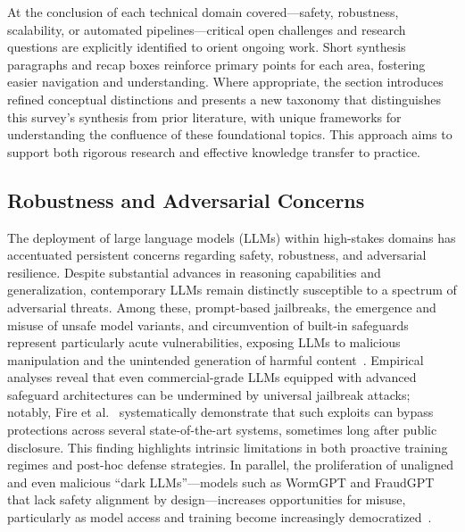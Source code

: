 \documentclass[sigconf]{acmart}
\begin{document}
At the conclusion of each technical domain covered—safety, robustness, scalability, or automated pipelines—critical open challenges and research questions are explicitly identified to orient ongoing work. Short synthesis paragraphs and recap boxes reinforce primary points for each area, fostering easier navigation and understanding. Where appropriate, the section introduces refined conceptual distinctions and presents a new taxonomy that distinguishes this survey's synthesis from prior literature, with unique frameworks for understanding the confluence of these foundational topics. This approach aims to support both rigorous research and effective knowledge transfer to practice.

\subsection{Robustness and Adversarial Concerns}

The deployment of large language models (LLMs) within high-stakes domains has accentuated persistent concerns regarding safety, robustness, and adversarial resilience. Despite substantial advances in reasoning capabilities and generalization, contemporary LLMs remain distinctly susceptible to a spectrum of adversarial threats. Among these, prompt-based jailbreaks, the emergence and misuse of unsafe model variants, and circumvention of built-in safeguards represent particularly acute vulnerabilities, exposing LLMs to malicious manipulation and the unintended generation of harmful content~\cite{ref78,ref82}. Empirical analyses reveal that even commercial-grade LLMs equipped with advanced safeguard architectures can be undermined by universal jailbreak attacks; notably, Fire et al.~\cite{ref82} systematically demonstrate that such exploits can bypass protections across several state-of-the-art systems, sometimes long after public disclosure. This finding highlights intrinsic limitations in both proactive training regimes and post-hoc defense strategies. In parallel, the proliferation of unaligned and even malicious “dark LLMs”—models such as WormGPT and FraudGPT that lack safety alignment by design—increases opportunities for misuse, particularly as model access and training become increasingly democratized~\cite{ref82,ref78}.
\end{document}
